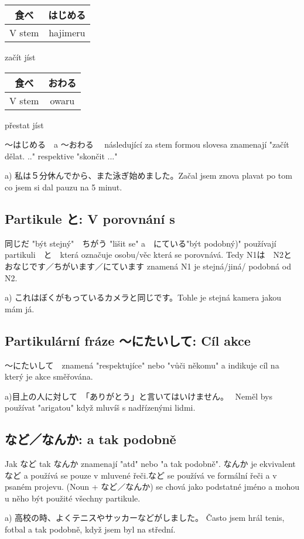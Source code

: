 \begin{center}
\begin{tabular}{||c|c||}
\hline
食べ&はじめる\\
\hline
V stem &hajimeru\\
\hline
\end{tabular}
\end{center}
začít jíst

\begin{center}
\begin{tabular}{||c|c||}
\hline
食べ&おわる\\
\hline
V stem&owaru\\
\hline
\end{tabular}
\end{center}
přestat jíst


〜はじめる　a 〜おわる　 následující za stem formou slovesa znamenají "začít dělat. .." respektive "skončit ..."

a) 私は５分休んでから、また泳ぎ始めました。Začal jsem znova plavat po tom co jsem si dal pauzu na 5 minut.

\subsection{Partikule と: V porovnání s}

同じだ "být stejný"　ちがう "lišit se" a　にている"být podobný)" používají partikuli　と　která označuje osobu/věc která se porovnává. Tedy N1は　N2と　おなじです／ちがいます／にています znamená N1 je stejná/jiná/ podobná od N2.

a) これはぼくがもっているカメラと同じです。Tohle je stejná kamera jakou mám já.

\subsection{Partikulární fráze 〜にたいして: Cíl akce}

〜にたいして　znamená "respektujíce" nebo "vůči někomu" a indikuje cíl na který je akce směřována.


a)目上の人に対して　「ありがとう」と言いてはいけません。　 Neměl bys používat "arigatou" když mluvíš s nadřízenými lidmi.

\subsection{など／なんか: a tak podobně}

Jak など tak なんか znamenají "atd" nebo "a tak podobně". なんか je ekvivalent など  a používá se pouze v mluvené řeči.など se používá ve formální řeči  a v psaném projevu. (Noun + など／なんか) se chová jako podstatné jméno a mohou u něho být použité všechny partikule. 

a) 高校の時、よくテニスやサッカーなどがしました。 Často jsem hrál tenis, fotbal a tak podobně, když jsem byl na střední. 





















